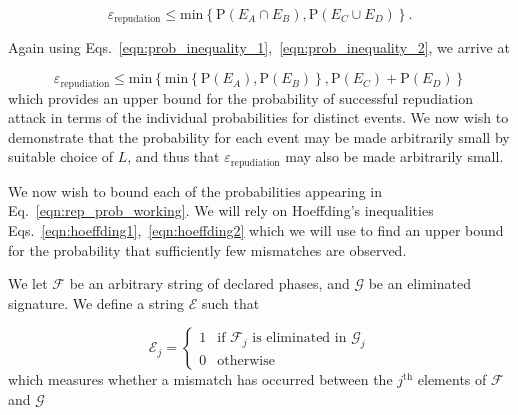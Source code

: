 \begin{equation}
\varepsilon_{\text{repudation}} \le \text{min}\left\{\text{P}\left(E_A \cap E_B\right), \text{P}\left(E_C \cup E_D\right)\right\}.
\end{equation}

\noindent Again using Eqs.~\ref{eqn:prob_inequality_1},~\ref{eqn:prob_inequality_2}, we arrive at

\begin{equation}\label{eqn:rep_prob_working}
\varepsilon_{\text{repudiation}} \le \text{min}\left\{
\text{min}\left\{\text{P}\left(E_A\right), \text{P}\left(E_B\right) \right\}, \text{P}\left(E_C\right) + \text{P}\left(E_D\right)\right\}
\end{equation}
which provides an upper bound for the probability of successful repudiation attack in terms of the individual probabilities for distinct events. We now wish to demonstrate that the probability for each event may be made arbitrarily small by suitable choice of $L$, and thus that $\varepsilon_{\text{repudiation}}$ may also be made arbitrarily small.


We now wish to bound each of the probabilities appearing in Eq.~\ref{eqn:rep_prob_working}. We will rely on Hoeffding's inequalities Eqs.~\ref{eqn:hoeffding1},~\ref{eqn:hoeffding2} which we will use to find an upper bound for the probability that sufficiently few mismatches are observed.

We let $\mathcal{F}$ be an arbitrary string of declared phases, and $\mathcal{G}$ be an eliminated signature. We define a string $\mathcal{E}$ such that

\begin{equation*}\label{eqn:error}
\mathcal{E}_j = 
\begin{cases}
1 & \text{if $\mathcal{F}_j$ is eliminated in $\mathcal{G}_j$} \\
0 & \text{otherwise}
\end{cases}
\end{equation*}
which measures whether a mismatch has occurred between the $j^\text{th}$ elements of $\mathcal{F}$ and $\mathcal{G}$ %

